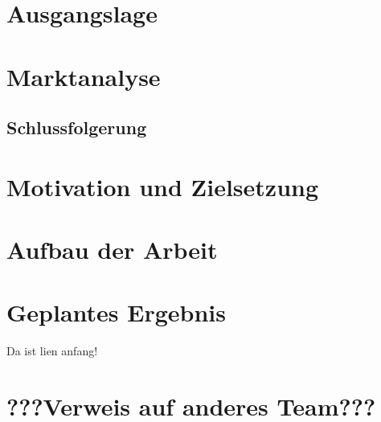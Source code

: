 \section{Ausgangslage}
\setauthor{\firstauthor}

\section{Marktanalyse}
\subsection{Schlussfolgerung}

\section{Motivation und Zielsetzung}

\section{Aufbau der Arbeit}

\section{Geplantes Ergebnis}

\setauthor{\secondauthor}
Da ist lien anfang!
\section{???Verweis auf anderes Team???}
